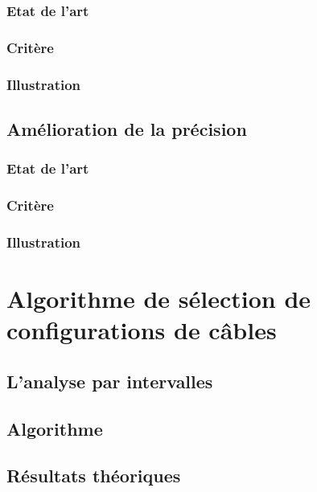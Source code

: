 \subsubsection{Etat de l'art}

\subsubsection{Crit\`ere}

\subsubsection{Illustration}

\subsection{Am\'elioration de la pr\'ecision}

\subsubsection{Etat de l'art}

\subsubsection{Crit\`ere}

\subsubsection{Illustration}

\section{Algorithme de s\'election de configurations de c\^ables}

\subsection{L'analyse par intervalles}

\subsection{Algorithme}

\subsection{R\'esultats th\'eoriques}
